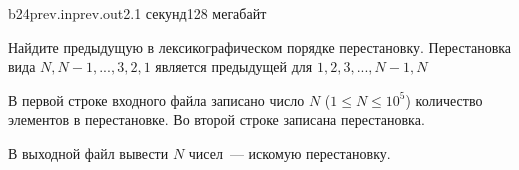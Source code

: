 \documentclass[12pt,a4paper,oneside,twocolumn,landscape]{article}
\begin{document}
\raggedbottom

\begin{problem}{b24}{prev.in}{prev.out}{2.1 секунд}{128 мегабайт}{}
\graphicspath{{.././statements/}}


Найдите предыдущую в лексикографическом порядке перестановку. Перестановка вида $N, N - 1, ... , 3, 2, 1$ является предыдущей для $1, 2, 3, ... , N - 1, N$

\InputFile
В первой строке входного файла записано число $N$  ($1 \leqslant N \leqslant 10^5$)  количество элементов в перестановке. Во второй строке записана перестановка.

\OutputFile
В выходной файл вывести $N$ чисел~--- искомую перестановку.


\Example

\begin{example}
%
\end{example}


\end{problem}
\end{document}

